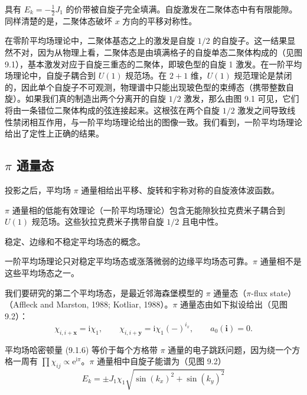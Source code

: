 具有 $E_k=-\frac{1}{2}J_1$ 的价带被自旋子完全填满。自旋激发在二聚体态中有有限能隙。同样清楚的是，二聚体态破坏 $x$ 方向的平移对称性。

在零阶平均场理论中，二聚体基态之上的激发是自旋 $1/2$ 的自旋子。这一结果显然不对，因为从物理上看，二聚体态是由填满格子的自旋单态二聚体构成的（见图 9.1），基本激发对应于自旋三重态的二聚体，即玻色型的自旋 1 激发。在一阶平均场理论中，自旋子耦合到 $U(1)$ 规范场。在 $2+1$ 维，$U(1)$ 规范理论是禁闭的，因此单个自旋子不可观测，物理谱中只能出现玻色型的束缚态（携带整数自旋）。如果我们真的制造出两个分离开的自旋 $1/2$ 激发，那么由图 9.1 可见，它们将由一条错位二聚体构成的弦连接起来。这根弦在两个自旋 $1/2$ 激发之间导致线性禁闭相互作用，与一阶平均场理论给出的图像一致。我们看到，一阶平均场理论给出了定性上正确的结果。


\subsection{$\pi$ 通量态}

\begin{keypoints}
\item 投影之后，平均场 $\pi$ 通量相给出平移、旋转和宇称对称的自旋液体波函数。
\item $\pi$ 通量相的低能有效理论（一阶平均场理论）包含无能隙狄拉克费米子耦合到 $U(1)$ 规范场。这些狄拉克费米子携带自旋 $1/2$ 且电中性。
\item 稳定、边缘和不稳定平均场态的概念。
\item 一阶平均场理论只对稳定平均场态或涨落微弱的边缘平均场态可靠。$\pi$ 通量相不是这些平均场态之一。
\end{keypoints}

我们要研究的第二个平均场态，是最近邻海森堡模型的 $\pi$ 通量态（$\pi$-flux state）（Affleck and Marston, 1988; Kotliar, 1988）。$\pi$ 通量态由如下拟设给出（见图 9.2）：
\begin{equation*}
\chi_{i,i+\pmb{x}}=\mathrm{i}\chi_1,\qquad \chi_{i,i+\pmb{y}}=\mathrm{i}\chi_1(-)^{i_x},\qquad a_0(\pmb{i})=0.
\tag{9.1.18}
\end{equation*}

平均场哈密顿量 (9.1.6) 等价于每个方格带 $\pi$ 通量的电子跳跃问题，因为绕一个方格一周有 $\prod\chi_{ij}\propto\mathrm{e}^{\mathrm{i}\pi}$。$\pi$ 通量相中自旋子能谱为（见图 9.2）
\begin{equation*}
E_k=\pm J_1\chi_1\sqrt{\sin(k_x)^{2}+\sin(k_y)^{2}}
\tag{9.1.19}
\end{equation*}

